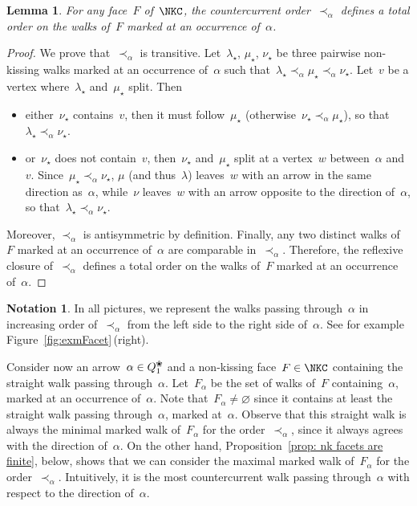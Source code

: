 \documentclass{amsart}
\newtheorem{lemma}[theorem]{Lemma}
\theoremstyle{definition}
\newtheorem{notation}[theorem]{Notation}
\newcommand{\fref}[1]{Figure~\ref{#1}} %
\newcommand{\blossom}{^\text{\ding{96}}} %
\begin{document}

\begin{lemma}
For any face~$F$ of~$\NKC$, the countercurrent order~$\prec_\alpha$ defines a total order on the walks of~$F$ marked at an occurrence of~$\alpha$.
\end{lemma}

\begin{proof}
We prove that~$\prec_\alpha$ is transitive.
Let~$\lambda_\star$, $\mu_\star$, $\nu_\star$ be three pairwise non-kissing walks marked at an occurrence of~$\alpha$ such that~${\lambda_\star \prec_\alpha \mu_\star \prec_\alpha \nu_\star}$. Let~$v$ be a vertex where~$\lambda_\star$ and~$\mu_\star$ split. Then
\begin{itemize}
\item either~$\nu_\star$ contains~$v$, then it must follow~$\mu_\star$ (otherwise~$\nu_\star \prec_\alpha \mu_\star$), so that~$\lambda_\star \prec_\alpha \nu_\star$.
\item or~$\nu_\star$ does not contain~$v$, then~$\nu_\star$ and~$\mu_\star$ split at a vertex~$w$ between~$\alpha$ and~$v$. Since~${\mu_\star \prec_\alpha \nu_\star}$, $\mu$ (and thus~$\lambda$) leaves~$w$ with an arrow in the same direction as~$\alpha$, while~$\nu$ leaves~$w$ with an arrow opposite to the direction of~$\alpha$, so that~$\lambda_\star \prec_\alpha \nu_\star$.
\end{itemize}
Moreover, $\prec_\alpha$ is antisymmetric by definition.
Finally, any two distinct walks of~$F$ marked at an occurrence of~$\alpha$ are comparable in~$\prec_\alpha$.
Therefore, the reflexive closure of~$\prec_\alpha$ defines a total order on the walks of~$F$ marked at an occurrence of~$\alpha$.
\end{proof}

\begin{notation}
In all pictures, we represent the walks passing through~$\alpha$ in increasing order of~$\prec_\alpha$ from the left side to the right side of~$\alpha$. See for example \fref{fig:exmFacet}\,(right).
\end{notation}

Consider now an arrow~$\alpha \in Q\blossom_1$ and a non-kissing face~$F \in \NKC$ containing the straight walk passing through~$\alpha$.
Let~$F_\alpha$ be the set of walks of~$F$ containing~$\alpha$, marked at an occurrence of~$\alpha$.
Note that~$F_\alpha \ne \varnothing$ since it contains at least the straight walk passing through~$\alpha$, marked at~$\alpha$.
Observe that this straight walk is always the minimal marked walk of~$F_\alpha$ for the order~$\prec_\alpha$, since it always agrees with the direction of~$\alpha$.
On the other hand, Proposition~\ref{prop: nk facets are finite}, below, shows that we can consider the maximal marked walk of~$F_\alpha$ for the order~$\prec_\alpha$.
Intuitively, it is the most countercurrent walk passing through~$\alpha$ with respect to the direction of~$\alpha$.
\end{document}

